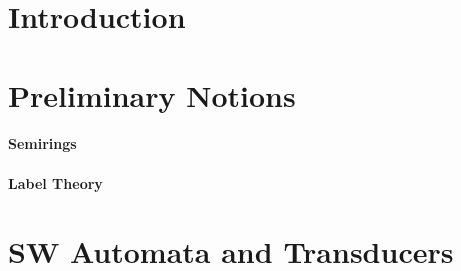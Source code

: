 \begin{abstract}

\end{abstract}





\section{Introduction} \label{sec:intro}




\section{Preliminary Notions}
\label{section:prelim}\label{sec:prelim}




\paragraph*{Semirings}
\label{section:semiring}\label{sec:semiring}



\paragraph*{Label Theory}
\label{section:symbols}





\section{SW Automata and Transducers}
\label{section:transducer}\label{sec:transducer}
\label{section:SWA}\label{sec:SWA}
\label{section:SWT}\label{sec:SWT}

